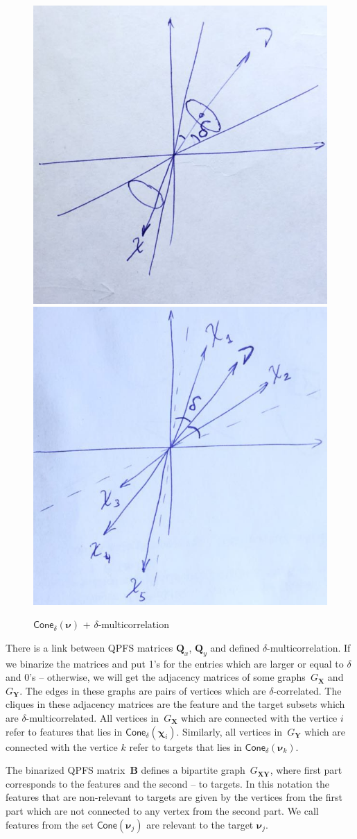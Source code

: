 \documentclass[12pt,twoside]{article}
\theoremstyle{definition}
\newcommand{\bY}{\mathbf{Y}}
\newcommand{\bX}{\mathbf{X}}
\newcommand{\bB}{\mathbf{B}}
\newcommand{\bQ}{\mathbf{Q}}
\newcommand{\bchi}{\boldsymbol{\chi}}
\newcommand{\bnu}{\boldsymbol{\nu}}
\begin{document}
\begin{figure}
	\centering
	\includegraphics[width=0.48\linewidth]{figs/cone_by_hand}
	\includegraphics[width=0.48\linewidth]{figs/multicorr_by_hand} 
	\caption{$\textsf{Cone}_{\delta}(\bnu)$ + $\delta$-multicorrelation}
\end{figure}

There is a link between QPFS matrices $\bQ_x$, $\bQ_y$ and defined $\delta$-multicorrelation.
If we binarize the matrices and put 1's for the entries which are larger or equal to $\delta$ and 0's -- otherwise, we will get the adjacency matrices of some graphs~$G_{\bX}$ and $G_{\bY}$. The edges in these graphs are pairs of vertices which are $\delta$-correlated. The cliques in these adjacency matrices are the feature and the target subsets which are $\delta$-multicorrelated. All vertices in~$G_{\bX}$ which are connected with the vertice $i$ refer to features that lies in $\textsf{Cone}_{\delta}(\bchi_i)$. Similarly, all vertices in~$G_{\bY}$ which are connected with the vertice $k$ refer to targets that lies in $\textsf{Cone}_{\delta}(\bnu_k)$.

The binarized QPFS matrix~$\bB$ defines a bipartite graph~$G_{\bX\bY}$, where first part corresponds to the features and the second -- to targets. In this notation the features that are non-relevant to targets are given by the vertices from the first part which are not connected to any vertex from the second part. We call features from the set $\textsf{Cone}(\bnu_j)$ are relevant to the target $\bnu_j$.
\end{document}
